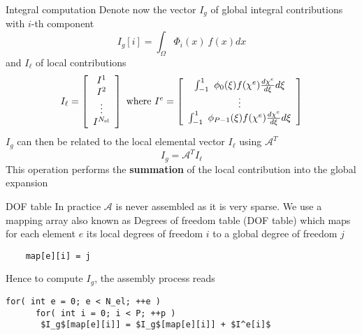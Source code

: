 \begin{frame}{Integral computation}
  Denote now the vector $I_g$ of global integral contributions with $i$-th component
  \begin{equation}
    \label{eq:54}
    I_g[i] = \int_\Omega \Phi_i(x)\ f(x) dx
  \end{equation}
  and $I_\ell$ of local contributions
  \begin{equation}
    \label{eq:55}
    I_\ell = \left[
      \begin{array}[c]{c}
        I^1\\
        I^2\\
        \vdots\\
        I^{N_\text{el}}
      \end{array}\right]
    \text{ where }
    I^e =  \left[
      \begin{array}[c]{c}
        \int_{-1}^1\ \phi_0(\xi) f(\chi^e) \frac{d \chi^e}{d \xi} d\xi\\
        \vdots\\
        \int_{-1}^1\ \phi_{P-1}(\xi) f(\chi^e) \frac{d \chi^e}{d \xi} d\xi
      \end{array}\right]
  \end{equation}
  $I_g$ can then be related to the local elemental vector $I_\ell$ using $\mathcal{A}^T$
  \begin{equation}
    \label{eq:56}
    I_g = \mathcal{A}^T I_\ell
  \end{equation}
  This operation performs the \textbf{summation} of the local contribution into the global expansion
\end{frame}

\begin{frame}[containsverbatim]{DOF table}
  In practice $\mathcal{A}$ is \alert{never assembled} as it is very
  sparse. We use a mapping array also known as Degrees of freedom
  table (DOF table) which maps for each element $e$ its local degrees
  of freedom $i$ to a global degree of freedom $j$
  \begin{lstlisting}
    map[e][i] = j
  \end{lstlisting}

  Hence to compute $I_g$, the assembly process reads
  \begin{lstlisting}[mathescape,texcl]
    for( int e = 0; e < N_el; ++e )
      for( int i = 0; i < P; ++p )
       $I_g$[map[e][i]] = $I_g$[map[e][i]] + $I^e[i]$
  \end{lstlisting}
\end{frame}

